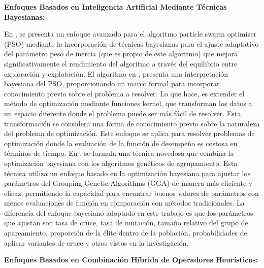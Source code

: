 \textbf{Enfoques Basados en Inteligencia Artificial Mediante Técnicas Bayesianas:}

En \cite{ZHANG2015138}, se presenta un enfoque avanzado para el algoritmo particle swarm optimizer (PSO) mediante la incorporación de técnicas bayesianas para el ajuste adaptativo del parámetro peso de inercia (que es propio de este algoritmo) que mejora significativamente el rendimiento del algoritmo a través del equilibrio entre exploración y explotación. El algoritmo en \cite{10.1371/journal.pone.0048710}, presenta una interpretación bayesiana del PSO, proporcionando un marco formal para incorporar conocimiento previo sobre el problema a resolver. Lo que hace, es extender el método de optimización mediante funciones kernel, que transforman los datos a un espacio diferente donde el problema puede ser más fácil de resolver. Esta transformación se considera una forma de conocimiento previo sobre la naturaleza del problema de optimización. Este enfoque se aplica para resolver problemas de optimización donde la evaluación de la función de desempeño es costosa en términos de tiempo. En \cite{logistics8010014}, se formula una técnica novedosa que combina la optimización bayesiana con los algoritmos genéticos de agrupamiento. Esta técnica utiliza un enfoque basado en la optimización bayesiana para ajustar los parámetros del Grouping Genetic Algorithms (GGA) de manera más eficiente y eficaz, permitiendo la capacidad para encontrar buenos valores de parámetros con menos evaluaciones de función en comparación con métodos tradicionales. La diferencia del enfoque bayesiano adoptado en este trabajo es que los parámetros que ajustan son tasa de cruce, tasa de mutación, tamaño relativo del grupo de apareamiento, proporción de la élite dentro de la población, probabilidades de aplicar variantes de cruce y otros vistos en la investigación.

\textbf{Enfoques Basados en Combinación Híbrida de Operadores Heurísticos:}

